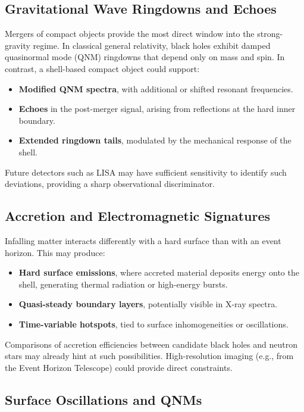 \documentclass[12pt]{article}
\begin{document}
\subsection{Gravitational Wave Ringdowns and Echoes}

Mergers of compact objects provide the most direct window into the strong-gravity regime. In classical general relativity, black holes exhibit damped quasinormal mode (QNM) ringdowns that depend only on mass and spin. In contrast, a shell-based compact object could support:

\begin{itemize}
    \item \textbf{Modified QNM spectra}, with additional or shifted resonant frequencies.
    \item \textbf{Echoes} in the post-merger signal, arising from reflections at the hard inner boundary.
    \item \textbf{Extended ringdown tails}, modulated by the mechanical response of the shell.
\end{itemize}

Future detectors such as LISA may have sufficient sensitivity to identify such deviations, providing a sharp observational discriminator.

\subsection{Accretion and Electromagnetic Signatures}

Infalling matter interacts differently with a hard surface than with an event horizon. This may produce:

\begin{itemize}
    \item \textbf{Hard surface emissions}, where accreted material deposits energy onto the shell, generating thermal radiation or high-energy bursts.
    \item \textbf{Quasi-steady boundary layers}, potentially visible in X-ray spectra.
    \item \textbf{Time-variable hotspots}, tied to surface inhomogeneities or oscillations.
\end{itemize}

Comparisons of accretion efficiencies between candidate black holes and neutron stars may already hint at such possibilities. High-resolution imaging (e.g., from the Event Horizon Telescope) could provide direct constraints.

\subsection{Surface Oscillations and QNMs}
\end{document}
